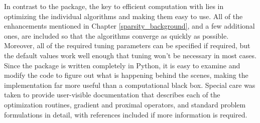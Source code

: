In contrast to the  package, the key to efficient computation with  lies in optimizing the individual algorithms and making them easy to use. All of the enhancements mentioned in Chapter \ref{sparsity_background}, and a few additional ones, are included so that the algorithms converge as quickly as possible. Moreover, all of the required tuning parameters can be specified if required, but the default values work well enough that tuning won't be necessary in most cases. Since the package is written completely in Python, it is easy to examine and modify the code to figure out what is happening behind the scenes, making the implementation far more useful than a computational black box. Special care was taken to provide user-visible documentation that describes each of the optimization routines, gradient and proximal operators, and standard problem formulations in detail, with references included if more information is required. 

